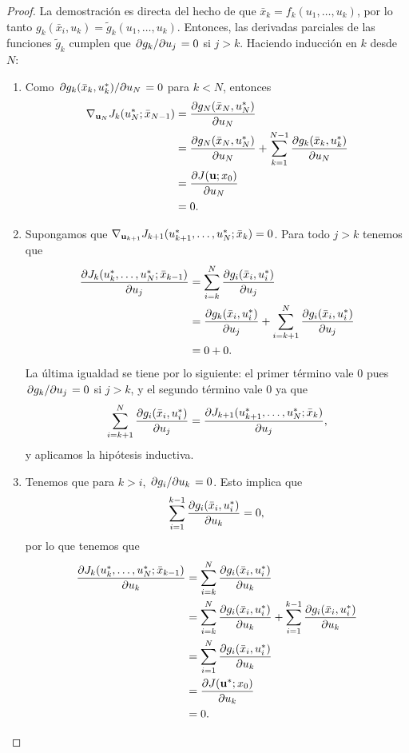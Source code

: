 \begin{proof}
	La demostración es directa del hecho de que \(\bar{x}_{k} = f_{k}(u_{1}, \dotsc, u_{k})\), por lo tanto \(g_{k}(\bar{x}_{i}, u_{k}) = \tilde{g}_{k}(u_{1}, \dotsc, u_{k})\). Entonces, las derivadas parciales de las funciones \(\tilde{g}_{k}\) cumplen que \(\pdv*{g_{k}}{u_{j}} = 0\) si \(j > k\). Haciendo inducción en \(k\) desde \(N\):
	
	\begin{enumerate}
		\item Como \(\pdv*{g_{k}(\bar{x}_{k}, u_{k}^{\ast})}{u_{N}} = 0\) para \(k < N\), entonces
		\begin{align*}
			\nabla_{\mathbf{u}_{N}} J_{k}(u_{N}^{\ast}; \bar{x}_{N-1})	&= \pdv{g_{N}(\bar{x}_{N}, u_{N}^{\ast})}{u_{N}}\\
																	&= \pdv{g_{N}(\bar{x}_{N}, u_{N}^{\ast})}{u_{N}} + \sum_{k=1}^{N-1} \pdv{g_{k}(\bar{x}_{k}, u_{k}^{\ast})}{u_{N}}\\
																	&= \pdv{J(\mathbf{u}; x_{0})}{u_{N}}\\
																	&= 0.
		\end{align*}
		\item Supongamos que \(\nabla_{\mathbf{u}_{k+1}} J_{k+1}(u_{k+1}^{\ast}, \dotsc, u_{N}^{\ast}; \bar{x}_{k}) = 0\). Para todo \(j > k\) tenemos que
		\begin{align*}
			\pdv{J_{k}(u_{k}^{\ast}, \dotsc, u_{N}^{\ast}; \bar{x}_{k-1})}{u_{j}}	&= \sum_{i=k}^{N}\pdv{g_{i}(\bar{x}_{i}, u_{i}^{\ast})}{u_{j}}\\
																					&= \pdv{g_{k}(\bar{x}_{i}, u_{i}^{\ast})}{u_{j}} + \sum_{i = k + 1}^{N}\pdv{g_{i}(\bar{x}_{i}, u_{i}^{\ast})}{u_{j}}\\
																					&= 0 + 0.
		\end{align*}
		La última igualdad se tiene por lo siguiente: el primer término vale \(0\) pues \(\pdv*{g_{k}}{u_{j}} = 0\) si \(j > k\), y el segundo término vale \(0\) ya que
		\[\sum_{i = k + 1}^{N} \pdv{g_{i}(\bar{x}_{i}, u_{i}^{\ast})}{u_{j}} = \pdv{J_{k+1}(u_{k+1}^{\ast}, \dotsc, u_{N}^{\ast}; \bar{x}_{k})}{u_{j}},\]
		y aplicamos la hipótesis inductiva.
		
		\item Tenemos que para \(k > i\), \(\pdv*{g_{i}}{u_{k}} = 0\). Esto implica que
		\[\sum_{i=1}^{k-1} \pdv{g_{i}(\bar{x}_{i}, u_{i}^{\ast})}{u_{k}} = 0,\]
		por lo que tenemos que
		\begin{align*}
			\pdv{J_{k}(u_{k}^{\ast}, \dotsc, u_{N}^{\ast}; \bar{x}_{k-1})}{u_{k}}	&= \sum_{i=k}^{N} \pdv{g_{i}(\bar{x}_{i}, u_{i}^{\ast})}{u_{k}}\\
																					&= \sum_{i=k}^{N} \pdv{g_{i}(\bar{x}_{i}, u_{i}^{\ast})}{u_{k}} + \sum_{i=1}^{k-1} \pdv{g_{i}(\bar{x}_{i}, u_{i}^{\ast})}{u_{k}}\\
																					&= \sum_{i=1}^{N} \pdv{g_{i}(\bar{x}_{i}, u_{i}^{\ast})}{u_{k}}\\
																					&= \pdv{J(\mathbf{u}^{\ast}; x_{0})}{u_{k}}\\
																					&= 0.
		\end{align*}
	\end{enumerate}
\end{proof}

